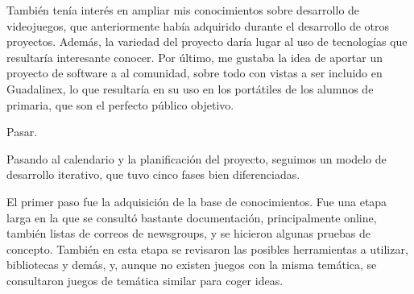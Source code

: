 \documentclass[landscape]{article}
\newenvironment{nota}
{%
\begin{framed} \noindent\itshape
}
{%
\end{framed}\vspace{-0.5cm} }
\begin{document}
\begin{multicols*}{2}
 También tenía interés en ampliar mis conocimientos sobre
desarrollo de videojuegos, que anteriormente había adquirido durante el
desarrollo de otros proyectos. Además, la variedad del proyecto daría lugar al
uso de tecnologías que resultaría interesante conocer. Por último, me gustaba la
idea de aportar un proyecto de software a al comunidad, sobre todo con vistas a
ser incluido en Guadalinex, lo que resultaría en su uso en los portátiles de los
alumnos de primaria, que son el perfecto público objetivo.

\begin{nota}
  Pasar.
\end{nota}

Pasando al calendario y la planificación del proyecto, seguimos un modelo de
desarrollo iterativo, que tuvo cinco fases bien diferenciadas.

 El primer paso fue la adquisición de la base de
conocimientos. Fue una etapa larga en la que se consultó bastante documentación,
principalmente online, también listas de correos de newsgroups, y se hicieron
algunas pruebas de concepto. También en esta etapa se revisaron las posibles
herramientas a utilizar, bibliotecas y demás, y, aunque no existen juegos con la
misma temática, se consultaron juegos de temática similar para coger ideas.

\vfill \pagebreak


\end{multicols*}
\end{document}
